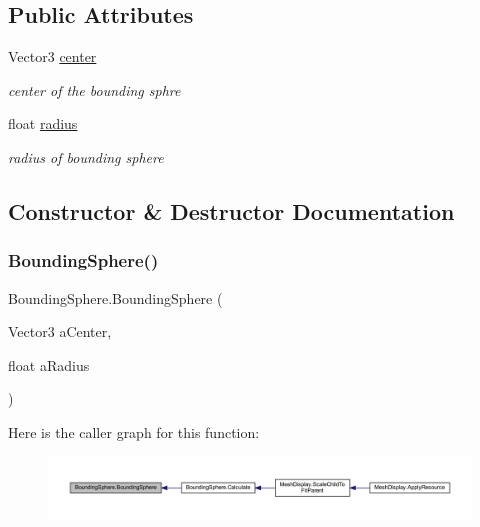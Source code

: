 \subsection*{Public Attributes}
\begin{DoxyCompactItemize}
\item 
Vector3 \mbox{\hyperlink{class_bounding_sphere_a0996d0f450c5e7fcca8446ebbd8ddc20}{center}}
\begin{DoxyCompactList}\small\item\em center of the bounding sphre \end{DoxyCompactList}\item 
float \mbox{\hyperlink{class_bounding_sphere_ad507cd54bc4021617024c2545fe9379c}{radius}}
\begin{DoxyCompactList}\small\item\em radius of bounding sphere \end{DoxyCompactList}\end{DoxyCompactItemize}


\subsection{Constructor \& Destructor Documentation}
\mbox{\label{class_bounding_sphere_ad35e7960a2e532e8f7cbebbca2136ef7}} 
\subsubsection{\texorpdfstring{Bounding\+Sphere()}{BoundingSphere()}}
{\footnotesize\ttfamily Bounding\+Sphere.\+Bounding\+Sphere (\begin{DoxyParamCaption}\item[{Vector3}]{a\+Center,  }\item[{float}]{a\+Radius }\end{DoxyParamCaption})}

Here is the caller graph for this function\+:
\nopagebreak
\begin{figure}[H]
\begin{center}
\leavevmode
\includegraphics[width=350pt]{class_bounding_sphere_ad35e7960a2e532e8f7cbebbca2136ef7_icgraph}
\end{center}
\end{figure}


